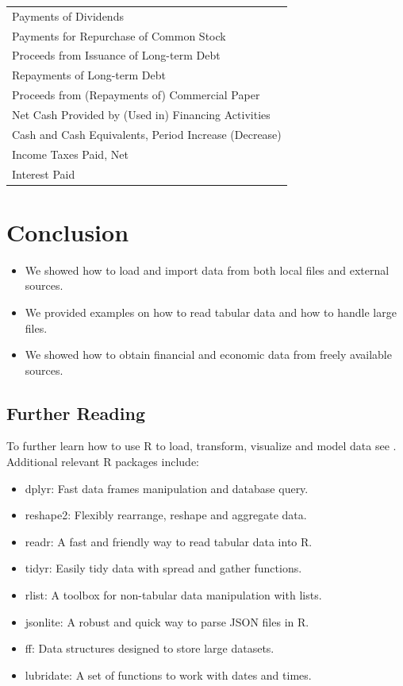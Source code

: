 \documentclass[]{book}
\providecommand{\tightlist}{%
  \setlength{\itemsep}{0pt}\setlength{\parskip}{0pt}}
\theoremstyle{definition}
\theoremstyle{definition}
\theoremstyle{definition}
\theoremstyle{remark}
\begin{document}
\begin{table}[t]
\begin{tabular}{l}
Payments of Dividends\\
Payments for Repurchase of Common Stock\\
Proceeds from Issuance of Long-term Debt\\
Repayments of Long-term Debt\\
\addlinespace
Proceeds from (Repayments of) Commercial Paper\\
Net Cash Provided by (Used in) Financing Activities\\
Cash and Cash Equivalents, Period Increase (Decrease)\\
Income Taxes Paid, Net\\
Interest Paid\\
\bottomrule
\end{tabular}
\end{table}

\section{Conclusion}\label{conclusion}

\begin{itemize}
\tightlist
\item
  We showed how to load and import data from both local files and
  external sources.
\item
  We provided examples on how to read tabular data and how to handle
  large files.
\item
  We showed how to obtain financial and economic data from freely
  available sources.
\end{itemize}

\subsection{Further Reading}\label{further-reading}

To further learn how to use R to load, transform, visualize and model
data see \citep{Wickham:2017:RDS:3086927}. Additional relevant R
packages include:

\begin{itemize}
\tightlist
\item
  dplyr: Fast data frames manipulation and database query.
\item
  reshape2: Flexibly rearrange, reshape and aggregate data.
\item
  readr: A fast and friendly way to read tabular data into R.
\item
  tidyr: Easily tidy data with spread and gather functions.
\item
  rlist: A toolbox for non-tabular data manipulation with lists.
\item
  jsonlite: A robust and quick way to parse JSON files in R.
\item
  ff: Data structures designed to store large datasets.
\item
  lubridate: A set of functions to work with dates and times.
\end{itemize}
\end{document}
